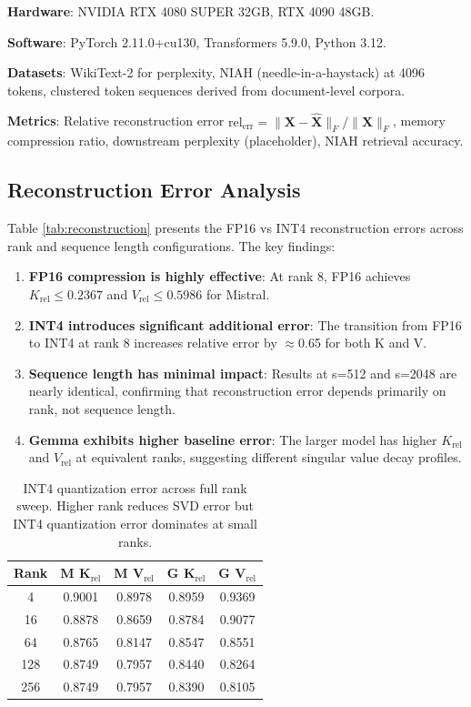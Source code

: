 \documentclass[11pt, a4paper, oneside]{article}
\theoremstyle{myplain}
\theoremstyle{mydefinition}
\theoremstyle{myremark}
\begin{document}
\textbf{Hardware}: NVIDIA RTX 4080 SUPER 32GB, RTX 4090 48GB.

\textbf{Software}: PyTorch 2.11.0+cu130, Transformers 5.9.0, Python 3.12.

\textbf{Datasets}: WikiText-2 for perplexity, NIAH (needle-in-a-haystack) at 4096 tokens, clustered token sequences derived from document-level corpora.

\textbf{Metrics}: Relative reconstruction error $\text{rel}_{\text{err}} = \|\mathbf{X} - \mathbf{\hat{X}}\|_F / \|\mathbf{X}\|_F$, memory compression ratio, downstream perplexity (placeholder), NIAH retrieval accuracy.

\subsection{Reconstruction Error Analysis}

Table \ref{tab:reconstruction} presents the FP16 vs INT4 reconstruction errors across rank and sequence length configurations. The key findings:

\begin{enumerate}
    \item \textbf{FP16 compression is highly effective}: At rank 8, FP16 achieves $K_{\text{rel}} \leq 0.2367$ and $V_{\text{rel}} \leq 0.5986$ for Mistral.
    \item \textbf{INT4 introduces significant additional error}: The transition from FP16 to INT4 at rank 8 increases relative error by $\approx$0.65 for both K and V.
    \item \textbf{Sequence length has minimal impact}: Results at s=512 and s=2048 are nearly identical, confirming that reconstruction error depends primarily on rank, not sequence length.
    \item \textbf{Gemma exhibits higher baseline error}: The larger model has higher $K_{\text{rel}}$ and $V_{\text{rel}}$ at equivalent ranks, suggesting different singular value decay profiles.
\end{enumerate}

\begin{table}[t]
    \centering
    \caption{INT4 quantization error across full rank sweep. Higher rank reduces SVD error but INT4 quantization error dominates at small ranks.}
    \begin{tabular}{c|c|c|c|c}
    \toprule
    \textbf{Rank} & \textbf{M K}$_{\text{rel}}$ & \textbf{M V}$_{\text{rel}}$ & \textbf{G K}$_{\text{rel}}$ & \textbf{G V}$_{\text{rel}}$ \\
    \midrule
    4 & 0.9001 & 0.8978 & 0.8959 & 0.9369 \\
    16 & 0.8878 & 0.8659 & 0.8784 & 0.9077 \\
    64 & 0.8765 & 0.8147 & 0.8547 & 0.8551 \\
    128 & 0.8749 & 0.7957 & 0.8440 & 0.8264 \\
    256 & 0.8749 & 0.7957 & 0.8390 & 0.8105 \\
    \bottomrule
    \end{tabular}
    \label{tab:int4_sweep}
\end{table}
\end{document}
